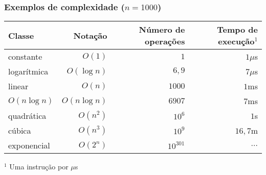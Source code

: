 \begin{frame}

	\frametitle{Exemplos de complexidade ($n = 1000$)}
	\begin{small}

	\begin{table}[ht]
	\centering
	\begin{tabular}{lrrr}
	\toprule
	\textbf{Classe} & \textbf{Notação} & \textbf{Número de operações} 
	& \textbf{Tempo de execução$^1$} \\
	\toprule
	constante & $O(1)$ & $1$ & $1\mu$s \\
	logarítmica & $O(\log n)$ & $6,9$ & $7\mu$s \\
	linear & $O(n)$ & $1000$ & $1$ms \\
	$O(n\log n)$ & $O(n\log n)$ & $6907$ & $7$ms \\
	quadrática & $O(n^2)$ & $10^6$ & $1$s \\
    cúbica & $O(n^3)$ & $10^9$ & $16,7$m \\
	exponencial & $O(2^n)$ & $10^{301}$ & $\ldots$ \\
	\bottomrule
	\end{tabular}
	\end{table}
	$^1$ Uma instrução por $\mu$s

	\end{small}

\end{frame}

